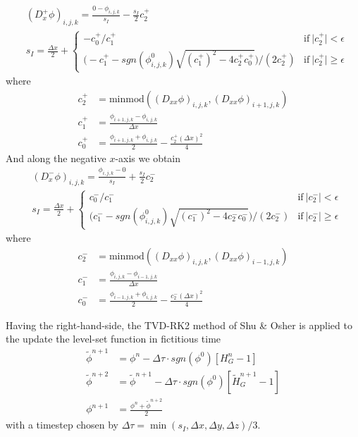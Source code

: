 \documentclass{elsarticle}
\begin{document}
\begin{align*}
 &(D_x^+\phi)_{i,j,k} = \frac{0 - \phi_{i,j,k}}{s_I} - \frac{s_I}{2} c_2^+\\
 & s_I = \frac{\Delta x}{2} + \left\{
 \begin{array}{ll}
 	-c_0^+/c_1^+    & \textrm{if} \ \vert c_2^+\vert<\epsilon \\
 	\bigg(-c_1^+ - sgn(\phi^0_{i,j,k})\sqrt{(c_1^+)^2 - 4c_2^+ c_0^+} \bigg)/(2 c_2^+)    & \textrm{if} \ \vert c_2^+\vert\ge \epsilon 
 \end{array}
\right.
\end{align*}
where 
\begin{align*}
	c_2^+ &= \textrm{minmod}((D_{xx}\phi)_{i,j,k}, (D_{xx}\phi)_{i+1,j,k}) \\
	c_1^+ &=  \frac{\phi_{i+1,j,k} - \phi_{i,j,k}}{\Delta x} \\
	c_0^+ &= \frac{\phi_{i+1,j,k} + \phi_{i,j,k}}{2} - \frac{c_2^+ (\Delta x)^2}{4}
\end{align*}
And along the negative $x$-axis we obtain
\begin{align*}
 &(D_x^-\phi)_{i,j,k} = \frac{\phi_{i,j,k} - 0}{s_I} + \frac{s_I}{2} c_2^-\\
 & s_I = \frac{\Delta x}{2} + \left\{
 \begin{array}{ll}
 	c_0^-/c_1^-    & \textrm{if} \ \vert c_2^-\vert<\epsilon \\
 	\bigg(c_1^- - sgn(\phi^0_{i,j,k})\sqrt{(c_1^-)^2 - 4c_2^- c_0^-} \bigg)/(2 c_2^-)    & \textrm{if} \ \vert c_2^-\vert\ge \epsilon 
 \end{array}
\right.
\end{align*}
where 
\begin{align*}
	c_2^- &= \textrm{minmod}((D_{xx}\phi)_{i,j,k}, (D_{xx}\phi)_{i-1,j,k}) \\
	c_1^- &= \frac{\phi_{i,j,k} - \phi_{i-1,j,k}}{\Delta x} \\
	c_0^- &= \frac{\phi_{i-1,j,k} + \phi_{i,j,k}}{2} - \frac{c_2^- (\Delta x)^2}{4}
\end{align*}


Having the right-hand-side, the TVD-RK2 method of Shu \& Osher \cite{shu1988efficient} is applied to the update the level-set function in fictitious time
\begin{align*}
	\tilde{\phi}^{n+1}&=\phi^n - \Delta \tau \cdot sgn(\phi^0) [ H_G^n -1] \\
	\tilde{\phi}^{n+2}&=\tilde{\phi}^{n+1} - \Delta \tau \cdot sgn(\phi^0) [ \tilde{H}_G^{n+1} -1] \\
	\phi^{n+1}&=\frac{\phi^n + \tilde{\phi}^{n+2}}{2}
\end{align*}
with a timestep chosen by $\Delta \tau = \min (s_I, \Delta x, \Delta y, \Delta z) / 3$.
\end{document}
